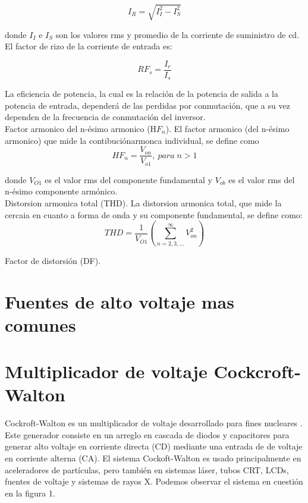 \begin{equation}
I_{R}=\sqrt{I_{I}^{2}-I_{S}^{2}}
\end{equation}

donde $I_{I}$ e $I_{S}$ son los valores rms y promedio de la corriente de suministro de cd.
El factor de rizo de la corriente de entrada es: 

\begin{equation}
RF_{s}=\dfrac{I_{r}}{I_{s}}
\end{equation}

La eficiencia de potencia, la cual es la relación de la potencia de salida a la potencia de entrada, dependerá de las perdidas por conmutación, que a su vez dependen de la frecuencia de conmutación del inversor.\\

Factor armonico del n-ésimo armonico (H$F_{n}$). El factor armonico (del n-ésimo armonico) que mide la contibuciónarmonca individual, se define como \begin{equation}
HF_{n}=\dfrac{V_{on}}{V_{o1}}, \: para\; n>1
\end{equation}

donde $V_{O1}$ es el valor rms del componente fundamental y $V_{ob}$ es el valor rms del n-ésimo componente armónico.\\

Distorsion armonica total (THD). La distorsion armonica total, que mide la cercaia en cuanto a forma de onda y su componente fundamental, se define como: \begin{equation}
THD=\dfrac{1}{V_{O1}}\left( \sum_{n=2,3,...}^{\infty }V_{on}^{2}\right)
\end{equation}

Factor de distorsión (DF). 
\section{Fuentes de alto voltaje mas comunes}


\section{Multiplicador de voltaje Cockcroft-Walton}
Cockroft-Walton es un multiplicador de voltaje desarrollado para fines nucleares \cite{CERN}. Este generador consiste en un arreglo en cascada de diodos y capacitores para generar alto voltaje en corriente directa (CD) mediante una entrada de de voltaje en corriente alterna (CA). El sistema Cockoft-Walton es usado principalmente en aceleradores de partículas, pero también en sistemas láser, tubos CRT, LCDs, fuentes de voltaje y sistemas de rayos X. Podemos observar el sistema en cuestión en la figura 1.  

